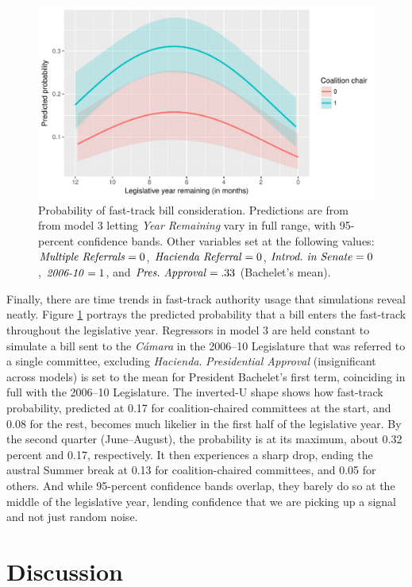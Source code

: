 \documentclass[letter,12pt]{article}
\begin{document}
\begin{figure}
  \centering
    \caption{Probability of fast-track bill consideration. Predictions are from from model 3 letting \emph{Year Remaining} vary in full range, with 95-percent confidence bands. Other variables set at the following values: $\text{\emph{Multiple Referrals}}=0$, $\text{\emph{Hacienda Referral}}=0$, $\text{\emph{Introd.~in~Senate}}=0$, $\text{\emph{2006-10}}=1$, and $\text{\emph{Pres.~Approval}}=.33$ (Bachelet's mean).}\label{F:sims}
    \includegraphics[width=.75\columnwidth]{../graphs/predictedPr.pdf}
\end{figure}

Finally, there are time trends in fast-track authority usage that simulations reveal neatly. Figure \ref{F:sims} portrays the predicted probability that a bill enters the fast-track throughout the legislative year. Regressors in model 3 are held constant to simulate a bill sent to the \emph{Cámara} in the 2006--10 Legislature that was referred to a single committee, excluding \emph{Hacienda}. \emph{Presidential Approval} (insignificant across models) is set to the mean for President Bachelet's first term, coinciding in full with the 2006--10 Legislature. The inverted-U shape shows how fast-track probability, predicted at 0.17 for coalition-chaired committees at the start, and 0.08 for the rest, becomes much likelier in the first half of the legislative year. By the second quarter (June--August), the probability is at its maximum, about 0.32 percent and 0.17, respectively. It then experiences a sharp drop, ending the austral Summer break at 0.13 for coalition-chaired committees, and 0.05 for others. And while 95-percent confidence bands overlap, they barely do so at the middle of the legislative year, lending confidence that we are picking up a signal and not just random noise. 

\section{Discussion}
\end{document}
